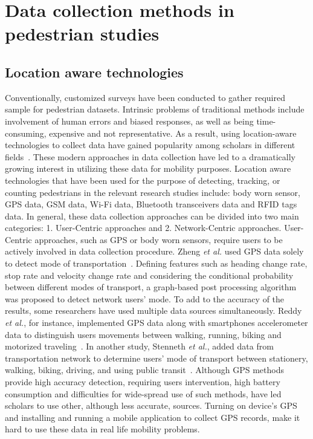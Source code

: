 \section{Data collection methods in pedestrian studies}
\label{chap1b:sec1}
\subsection{Location aware technologies}
Conventionally, customized surveys have been conducted to gather required sample for pedestrian datasets. Intrinsic problems of traditional methods include involvement of human errors and biased responses, as well as being time-consuming, expensive and not representative. As a result, using location-aware technologies to collect data have gained popularity among scholars in different fields~\cite{farooq2015ubiquitous}. These modern approaches in data collection have led to a dramatically growing interest in utilizing these data for mobility purposes. Location aware technologies that have been used for the purpose of detecting, tracking, or counting pedestrians in the relevant research studies include: body worn sensor, GPS data, GSM data, Wi-Fi data, Bluetooth transceivers data and RFID tags data. In general, these data collection approaches can be divided into two main categories: 1. User-Centric approaches and 2. Network-Centric approaches. User-Centric approaches, such as GPS or body worn sensors, require users to be actively involved in data collection procedure. Zheng \textit{et al.} used GPS data solely to detect mode of transportation~\cite{zheng2008understanding}. Defining features such as heading change rate, stop rate and velocity change rate and considering the conditional probability between different modes of transport, a graph-based post processing algorithm was proposed to detect network users' mode. To add to the accuracy of the results, some researchers have used multiple data sources simultaneously. Reddy \textit{et al.}, for instance, implemented GPS data along with smartphones accelerometer data to distinguish users movements between walking, running, biking and motorized traveling~\cite{reddy2008determining}. In another study, Stenneth \textit{et al.}, added data from transportation network to determine users' mode of transport between stationery, walking, biking, driving, and using public transit~\cite{stenneth2011transportation}. Although GPS methods provide high accuracy detection, requiring users intervention, high battery consumption and difficulties for wide-spread use of such methods, have led scholars to use other, although less accurate, sources. Turning on device's GPS and installing and running a mobile application to collect GPS records, make it hard to use these data in real life mobility problems.

